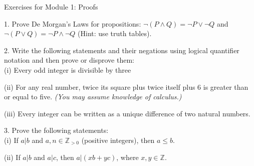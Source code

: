 \documentclass{article}
\theoremstyle{remark} %
\newcommand{\Z}{{\mathbb{Z}}}
\begin{document}
\begin{center}
\Large{Exercises for Module 1: Proofs}
\end{center}


1.  Prove De Morgan's Laws for propositions: $\neg (P \wedge Q) = \neg P \vee \neg Q$ and $\neg (P \vee Q) = \neg P \wedge \neg Q$ (Hint: use truth tables).

\vspace{11cm} %



2. Write the following statements and their negations using logical quantifier notation and then prove or disprove them: \\
(i) Every odd integer is divisible by three

\vspace{9cm} %


(ii) For any real number, twice its square plus twice itself plus 6 is greater than or equal to five. \textit{(You may assume knowledge of calculus.)}

\vspace{7cm} %


(iii) Every integer can be written as a unique difference of two natural numbers.


\vspace{7cm} %



3. Prove the following statements: \\
(i) If $a | b$ and $a,n \in \Z_{>0}$ (positive integers), then $a \leq b$.

\vspace{11cm} %



(ii) If $a | b$ and $a | c$, then $a | (x b + y c)$, where $x,y \in \Z$.
\end{document}
